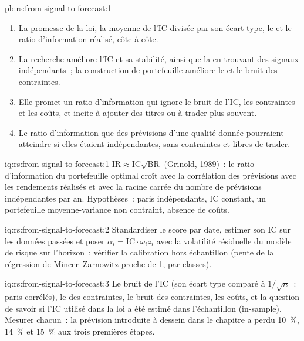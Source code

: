\begin{solution}{pb:rs:from-signal-to-forecast:1}
\begin{enumerate}
l'IC.
\item La promesse de la loi, la moyenne de l'IC divisée par son écart type, le  et le ratio d'information réalisé, côte à côte.
\item La recherche améliore l'IC et sa stabilité, ainsi que la  en trouvant des signaux indépendants~; la construction de portefeuille améliore le  et le bruit des contraintes.
\item Elle promet un ratio d'information qui ignore le bruit de l'IC, les contraintes et les coûts, et incite à ajouter des titres ou à trader plus souvent.
\item Le ratio d'information que des prévisions d'une qualité donnée pourraient atteindre si elles étaient indépendantes, sans contraintes et libres de trader.
\end{enumerate}
\end{solution}

\begin{solution}{iq:rs:from-signal-to-forecast:1}
$\mathrm{IR} \approx \mathrm{IC}\sqrt{\mathrm{BR}}$ (Grinold, 1989)~: le ratio d'information du portefeuille optimal croît avec la corrélation des prévisions avec
les rendements réalisés et avec la racine carrée du nombre de prévisions indépendantes par an. Hypothèses~: paris indépendants, IC constant, un
portefeuille moyenne-variance non contraint, absence de coûts.
\end{solution}

\begin{solution}{iq:rs:from-signal-to-forecast:2}
Standardiser le score par date, estimer son IC sur les données passées et poser $\alpha_i = \mathrm{IC}\cdot\omega_i z_i$ avec la volatilité résiduelle du modèle
de risque sur l'horizon~; vérifier la calibration hors échantillon (pente de la régression de Mincer--Zarnowitz proche de 1,  par classes).
\end{solution}

\begin{solution}{iq:rs:from-signal-to-forecast:3}
Le bruit de l'IC (son écart type comparé à $1/\sqrt n$~: paris corrélés), le  des contraintes, le bruit des contraintes, les coûts,
et la question de savoir si l'IC utilisé dans la loi a été estimé dans l'échantillon (in-sample). Mesurer chacun~: la prévision introduite à dessein dans le chapitre a perdu 10~\%, 14~\% et 15~\% aux trois premières étapes.
\end{solution}

